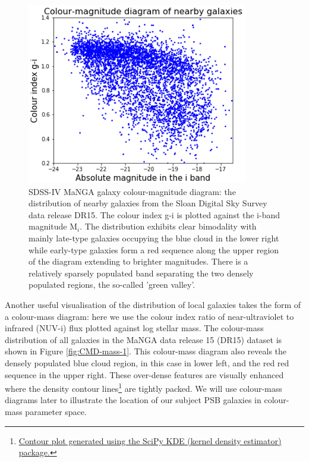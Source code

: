 \begin{figure}
    \centering
    \includegraphics[width=\columnwidth]{images/CMDs/CMD-G_i-i.png}
    \caption[SDSS-IV MaNGA galaxy colour-magnitude diagram]{SDSS-IV MaNGA galaxy colour-magnitude diagram: the distribution of nearby galaxies from the Sloan Digital Sky Survey data release DR15. The colour index g-i is plotted against the i-band magnitude M$_i$. The distribution exhibits clear bimodality with mainly late-type galaxies occupying the blue cloud in the lower right while early-type galaxies form a red sequence along the upper region of the diagram extending to brighter magnitudes. There is a relatively sparsely populated band separating the two densely populated regions, the so-called 'green valley'.}
    \label{fig:CMD-G_i-i}
\end{figure}

Another useful visualisation of the distribution of local galaxies takes the form of a colour-mass diagram: here we use the colour index ratio of near-ultraviolet to infrared (NUV-i) flux plotted against log stellar mass. The colour-mass distribution of all galaxies in the MaNGA data release 15 (DR15) dataset is shown in Figure \ref{fig:CMD-mass-1}. This colour-mass diagram also reveals the densely populated blue cloud region, in this case in lower left, and the red red sequence in the upper right. These over-dense features are visually enhanced where the density contour lines\footnote{\href{https://seaborn.pydata.org/generated/seaborn.kdeplot.html}{Contour plot generated using the SciPy KDE (kernel density estimator) package.}} are tightly packed. We will use colour-mass diagrams later to illustrate the location of our subject PSB galaxies in colour-mass parameter space.

